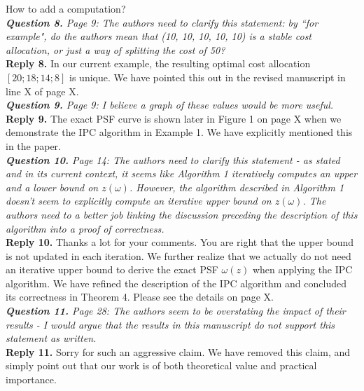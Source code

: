 \documentclass[11pt]{article}
\begin{document}
How to add a computation?
\\[4mm]
%
%
%
\noindent \textit{\textbf{Question 8.}
Page 9: The authors need to clarify this statement: by ``for example", do the authors mean that (10, 10, 10, 10, 10) is a stable cost allocation, or just a way of splitting the cost of 50?
}
\\[2mm]
\noindent \textbf{Reply 8.}
In our current example, the resulting optimal cost allocation $[20; 18; 14; 8]$ is unique.
We have pointed this out in the revised manuscript in line X of page X.
\\[4mm]
%
%
%
\noindent \textit{\textbf{Question 9.}
Page 9: I believe a graph of these values would be more useful.
}
\\[2mm]
\noindent \textbf{Reply 9.}
The exact PSF curve is shown later in Figure 1 on page X when we demonstrate the IPC algorithm in Example 1. We have explicitly mentioned this in the paper.
\\[4mm]
%
%
%
\noindent \textit{\textbf{Question 10.}
Page 14: The authors need to clarify this statement - as stated and in its current context, it seems like Algorithm 1 iteratively computes an upper and a lower bound on $z(\omega)$. However, the algorithm described in Algorithm 1 doesn't seem to explicitly compute an iterative upper bound on $z(\omega)$. The authors need to a better job linking the discussion preceding the description of this algorithm into a proof of correctness.
}
\\[2mm]
\noindent \textbf{Reply 10.}
Thanks a lot for your comments.
You are right that the upper bound is not updated in each iteration. We further realize that we actually do not need an iterative upper bound to derive the exact PSF $\omega(z)$ when applying the IPC algorithm.
We have refined the description of the IPC algorithm and concluded its correctness in Theorem 4.
Please see the details on page X.
\\[4mm]
%
%
%
\noindent \textit{\textbf{Question 11.}
Page 28: The authors seem to be overstating the impact of their results - I would argue that the results in this manuscript do not support this statement as written.
}
\\[2mm]
\noindent \textbf{Reply 11.}
Sorry for such an aggressive claim. We have removed this claim, and simply point out that our work is of both theoretical value and practical importance.
\\[4mm]



\end{document}
